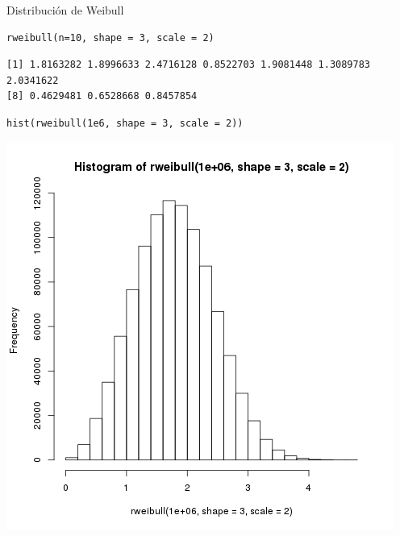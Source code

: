 \documentclass[xcolor={usenames,svgnames,dvipsnames}]{beamer}
\begin{document}
\begin{frame}[fragile,label=sec-3-6]{Distribución de Weibull}
 \lstset{language=R,label= ,caption= ,numbers=none}
\begin{lstlisting}
rweibull(n=10, shape = 3, scale = 2)
\end{lstlisting}

\begin{verbatim}
[1] 1.8163282 1.8996633 2.4716128 0.8522703 1.9081448 1.3089783 2.0341622
[8] 0.4629481 0.6528668 0.8457854
\end{verbatim}


\lstset{language=R,label= ,caption= ,numbers=none}
\begin{lstlisting}
hist(rweibull(1e6, shape = 3, scale = 2))
\end{lstlisting}

\includegraphics[height=0.6\textheight]{figs/rweibull.png}
\end{frame}
\end{document}
